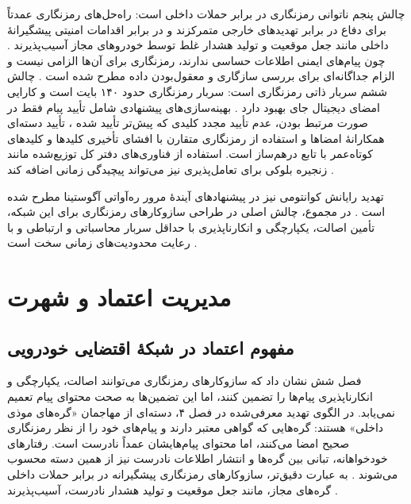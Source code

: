 \documentclass[12pt,a4paper]{article}
\begin{document}
چالش پنجم ناتوانی رمزنگاری در برابر حملات داخلی است: راه‌حل‌های رمزنگاری عمدتاً برای دفاع در برابر تهدید‌های خارجی متمرکزند و در برابر اقدامات امنیتی پیشگیرانهٔ داخلی مانند جعل موقعیت و تولید هشدار غلط توسط خودرو‌های مجاز آسیب‌پذیرند \cite{farsimadanReviewSecurityChallenges2025}. چون پیام‌های ایمنی اطلاعات حساسی ندارند، رمزنگاری برای آن‌ها الزامی نیست و الزام جداگانه‌ای برای بررسی سازگاری و معقول‌بودن داده مطرح شده است \cite{SecuringVehicularAd}. چالش ششم سربار ذاتی رمزنگاری است: سربار رمزنگاری حدود ۱۴۰ بایت است و کارایی امضای دیجیتال جای بهبود دارد \cite{SecuringVehicularAd}. بهینه‌سازی‌های پیشنهادی شامل تأیید پیام فقط در صورت مرتبط بودن، عدم تأیید مجدد کلیدی که پیش‌تر تأیید شده \cite{SecuringVehicularAd}، تأیید دسته‌ای همکارانهٔ امضا‌ها \cite{farsimadanReviewSecurityChallenges2025} و استفاده از رمزنگاری متقارن با افشای تأخیری کلید‌ها و کلید‌های کوتاه‌عمر با تابع درهم‌ساز \cite{farsimadanReviewSecurityChallenges2025} است. استفاده از فناوری‌های دفتر کل توزیع‌شده مانند زنجیره بلوکی برای تعامل‌پذیری نیز می‌تواند پیچیدگی زمانی اضافه کند \cite{farsimadanReviewSecurityChallenges2025}.

تهدید رایانش کوانتومی نیز در پیشنهاد‌های آیندهٔ مرور ره‌آواتی آگوستینا مطرح شده است \cite{rahmawatiagustinaSystematicLiteratureReview2025}. در مجموع، چالش اصلی در طراحی سازوکار‌های رمزنگاری برای این شبکه، تأمین اصالت، یکپارچگی و انکارناپذیری با حداقل سربار محاسباتی و ارتباطی و با رعایت محدودیت‌های زمانی سخت است \cite{SecuringVehicularAd, farsimadanReviewSecurityChallenges2025, zhangRAISEEfficientRSUAided2008}.

\section{مدیریت اعتماد و شهرت}

\subsection{مفهوم اعتماد در شبکهٔ اقتضایی خودرویی}

فصل شش نشان داد که سازوکار‌های رمزنگاری می‌توانند اصالت، یکپارچگی و انکارناپذیری پیام‌ها را تضمین کنند، اما این تضمین‌ها به صحت محتوای پیام تعمیم نمی‌یابد. در الگوی تهدید معرفی‌شده در فصل ۴، دسته‌ای از مهاجمان «گره‌های موذی داخلی» هستند: گره‌هایی که گواهی معتبر دارند و پیام‌های خود را از نظر رمزنگاری صحیح امضا می‌کنند، اما محتوای پیام‌هایشان عمداً نادرست است. رفتار‌های خودخواهانه، تبانی بین گره‌ها و انتشار اطلاعات نادرست نیز از همین دسته محسوب می‌شوند \cite{farsimadanReviewSecurityChallenges2025}. به عبارت دقیق‌تر، سازوکار‌های رمزنگاری پیشگیرانه در برابر حملات داخلی گره‌های مجاز، مانند جعل موقعیت و تولید هشدار نادرست، آسیب‌پذیرند \cite{farsimadanReviewSecurityChallenges2025}.
\end{document}
